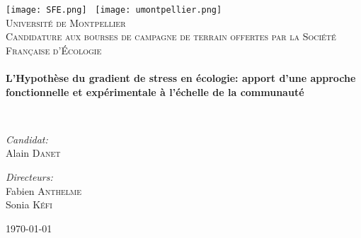 \begin{titlepage}
\begin{center}

\texttt{[image: SFE.png]}~ \hfill \texttt{[image: umontpellier.png]}~\\[1cm]

\textsc{\LARGE Université de Montpellier}\\[1.5cm]

\textsc{\large Candidature aux bourses de campagne de terrain offertes par la 
Société Française d'Écologie}\\[0.5cm]

\HRule \\[0.4cm]
{ \Large \bfseries  L'Hypothèse du gradient de stress en écologie: apport d'une approche fonctionnelle et expérimentale à l'échelle de la communauté \\[0.4cm] }

\HRule \\[1.5cm]

\noindent
\begin{minipage}{0.4\textwidth}
\begin{flushleft} \large
\emph{Candidat:}\\
Alain \textsc{Danet}
\end{flushleft}
\end{minipage}%
\begin{minipage}{0.4\textwidth}
\begin{flushright} \large
\emph{Directeurs:} \\
Fabien \textsc{Anthelme} \\[0.0cm]
Sonia \textsc{Kéfi}
\end{flushright}
\end{minipage}

\vfill

{\large \today}

\end{center}
\end{titlepage}
